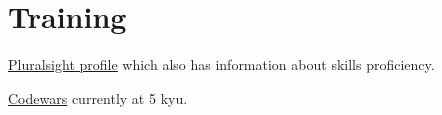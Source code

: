 \documentclass[]{deedy-resume-openfont}
\begin{document}

\newpage

\section{Training}
\descript{}
\begin{tightemize}
\item \href{https://app.pluralsight.com/profile/alexander-koik-cesto}{\underline{Pluralsight profile}} which also has information about skills proficiency.
\item \href{https://www.codewars.com/users/sirkoik}{\underline{Codewars}} currently at 5 kyu.
\end{tightemize}
\sectionsep

\end{document}
